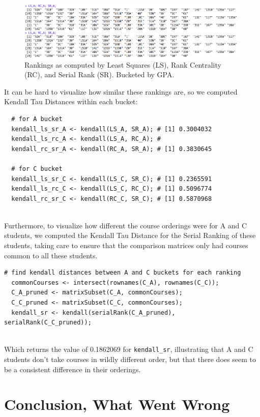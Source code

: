 \documentclass[10pt]{siamltex}
\begin{document}
\begin{pagewiselinenumbers}
\begin{figure}[H]
\includegraphics[width=6.5in]{rankings}
\caption{Rankings as computed by Least Squares (LS), Rank Centrality (RC), and Serial Rank (SR). Bucketed by GPA.}
\end{figure}

It can be hard to visualize how similar these rankings are, so we computed Kendall Tau Distances within each bucket:\\

\begin{verbatim}
  # for A bucket
  kendall_ls_sr_A <- kendall(LS_A, SR_A); # [1] 0.3004032
  kendall_ls_rc_A <- kendall(LS_A, RC_A); #
  kendall_rc_sr_A <- kendall(RC_A, SR_A); # [1] 0.3830645
  
  # for C bucket
  kendall_ls_sr_C <- kendall(LS_C, SR_C); # [1] 0.2365591
  kendall_ls_rc_C <- kendall(LS_C, RC_C); # [1] 0.5096774
  kendall_rc_sr_C <- kendall(RC_C, SR_C); # [1] 0.5870968
\end{verbatim}
\textcolor{white}{.}\\
Furthermore, to visualize how different the course orderings were for A and C students, we computed the Kendall Tau Distance for the Serial Ranking of these students, taking care to ensure that the comparison matrices only had courses common to all these students.\\

\begin{verbatim}
# find kendall distances between A and C buckets for each ranking
  commonCourses <- intersect(rownames(C_A), rownames(C_C));
  C_A_pruned <- matrixSubset(C_A, commonCourses);
  C_C_pruned <- matrixSubset(C_C, commonCourses);
  kendall_sr <- kendall(serialRank(C_A_pruned), serialRank(C_C_pruned));
\end{verbatim}
\textcolor{white}{.}\\
Which returns the value of 0.1862069 for \texttt{kendall\_sr}, illustrating that A and C students don't take courses in wildly different order, but that there does seem to be a consistent difference in their orderings.

\section{Conclusion, What Went Wrong}  \label{sec:conclusion}

\end{pagewiselinenumbers}
\end{document}
